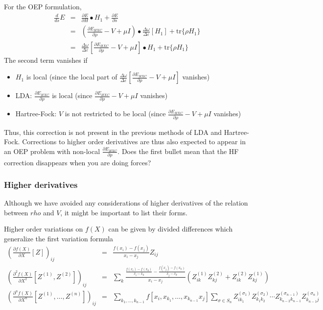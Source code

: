 \documentclass{article}
\newcommand{\beas}{\begin{eqnarray*}}
\newcommand{\enas}{\end{eqnarray*}}
\newcommand{\trace}{\mbox{tr}} \newcommand{\real}{\mathcal Re}
\newcommand{\Vscp}{V}
\newcommand{\Red}{\color{red}}
\begin{document}
For the OEP formulation,
\beas
\frac{d}{ds} E &=&
         \frac{\partial E}{\partial H} \bullet H_1+
          \frac{\partial E}{\partial s}\\
 &=&
      \left( \frac{\partial E_{HXC}}{\partial \rho} - \Vscp + \mu I \right)
      \bullet       \frac{\Delta \omega}{\Delta \varepsilon}
      \left[H_1\right]+ \trace\{\rho H_1\}\\
 &=&
      \frac{\Delta \omega}{\Delta \varepsilon}
      \left[ \frac{\partial E_{HXC}}{\partial \rho} - \Vscp + \mu I \right]
      \bullet H_1+ \trace\{\rho H_1\}
\enas
The second term vanishes if
\begin{itemize}
\item $H_1$ is local (since the local part of 
$\frac{\Delta \omega}{\Delta \varepsilon}
      \left[ \frac{\partial E_{HXC}}{\partial \rho} - \Vscp + \mu I \right]$
vanishes)
\item LDA: $\frac{\partial E_{HXC}}{\partial \rho}$ is local
(since $\frac{\partial E_{HXC}}{\partial \rho} - \Vscp + \mu I$ vanishes)
\item Hartree-Fock: $\Vscp$ is not restricted to be local
(since $\frac{\partial E_{HXC}}{\partial \rho} - \Vscp + \mu I$ vanishes)
\end{itemize}
Thus, this correction is not present in the previous methods of
LDA and Hartree-Fock.  Corrections to higher order derivatives are
thus also expected to appear in an OEP problem with non-local
$\frac{\partial E_{HXC}}{\partial \rho}$.
{\Red Does the first bullet mean that the HF correction disappears
when you are doing forces?}

\subsubsection{Higher derivatives}

Although we have avoided any considerations of higher derivatives of
the relation between $rho$ and $\Vscp$, it might be important to
list their forms.

Higher order variations on $f(X)$ can be given by divided differences
which generalize the first variation formula
\beas
\left(\frac{\partial f(X)}{\partial X}\left[Z\right]\right)_{ij}
 &=&
  \frac{f(x_{i}) - f(x_{j})}{x_{i}-x_{j}} Z_{ij}\\
\left(\frac{\partial^2 f(X)}{\partial X^2}\left[Z^{(1)},Z^{(2)}\right]\right)_{ij}
 &=&
  \sum_k \frac{
  \frac{f(x_{i}) - f(x_{k})}{x_{i}-x_{k}}
  -\frac{f(x_{j}) - f(x_{k})}{x_{j}-x_{k}}
  }
       {x_{i}-x_{j}}
 \left(Z^{(1)}_{ik} Z^{(2)}_{kj}+Z^{(2)}_{ik} Z^{(1)}_{kj}\right)\\
\left(\frac{\partial^n f(X)}{\partial X^n}\left[Z^{(1)},\ldots,Z^{(n)}\right]\right)_{ij}
 &=&
 \sum_{k_1,\ldots,k_{n-1}} f[x_{i},x_{k_1},\ldots,x_{k_{n-1}}
                                 x_{j}]
 \sum_{\sigma \in S_n} 
  Z^{(\sigma_1)}_{ik_1} Z^{(\sigma_2)}_{k_1k_2} \cdots Z^{(\sigma_{n-1})}_{k_{n-2}k_{n-1}} Z^{(\sigma_n)}_{k_{n-1}j}
\enas
\end{document}
